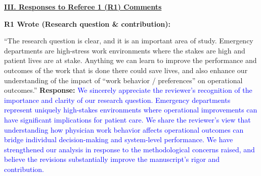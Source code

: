 \documentclass[11pt]{article}
\newenvironment{quote2}
{ \bigskip
\noindent
         \small\em
         \baselineskip=14pt
}
\newcommand{\1}{\hbox{\rm 1\kern-.35em 1}}
\begin{document}
\pagestyle{fancy}
\fancyhead{}
\renewcommand{\headrulewidth}{0pt}

\noindent\underline{\textbf{III. Responses to Referee 1 (R1) Comments}}

\begin{quote2}
\textbf{R1 Wrote (Research question \& contribution):}  

\noindent``The research question is clear, and it is an important area of study. Emergency departments are
high-stress work environments where the stakes are high and patient lives are at stake.
Anything we can learn to improve the performance and outcomes of the work that is done there
could save lives, and also enhance our understanding of the impact of “work behavior /
preferences” on operational outcomes.” 
\end{quote2}

\noindent\textbf{Response:} \textcolor{blue}{We sincerely appreciate the reviewer's recognition of the importance and clarity of our research question. Emergency departments represent uniquely high-stakes environments where operational improvements can have significant implications for patient care. We share the reviewer's view that understanding how physician work behavior affects operational outcomes can bridge individual decision-making and system-level performance. We have strengthened our analysis in response to the methodological concerns raised, and believe the revisions substantially improve the manuscript's rigor and contribution.}
\end{document}
